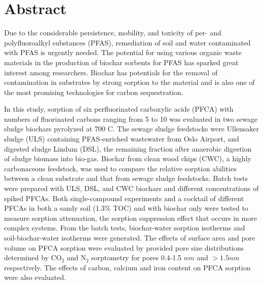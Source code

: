 \newpage
{}
\section*{Abstract}
Due to the considerable persistence, mobility, and toxicity of per- and polyfluoroalkyl substances (PFAS), remediation of soil and water contaminated with PFAS is urgently needed. The potential for using various organic waste materials in the production of biochar sorbents for PFAS has sparked great interest among researchers. Biochar has potentials for the removal of contamination in substrates by strong sorption to the material and is also one of the most promising technologies for carbon sequestration.

In this study, sorption of six perfluorinated carboxylic acids (PFCA) with numbers of fluorinated carbons ranging from 5 to 10 was evaluated in two sewage sludge biochars pyrolyzed at 700 \textdegree C. The sewage sludge feedstocks were Ullensaker sludge (ULS) containing PFAS-enriched wastewater from Oslo Airport, and digested sludge Lindum (DSL), the remaining fraction after anaerobic digestion of sludge biomass into bio-gas. Biochar from clean wood chips (CWC), a highly carbonaceous feedstock, was used to compare the relative sorption abilities between a clean substrate and that from sewage sludge feedstocks. Batch tests were prepared with ULS, DSL, and CWC biochars and different concentrations of spiked PFCAs. Both single-compound experiments and a cocktail of different PFCAs in both a sandy soil (1.3\% TOC) and with biochar only were tested to measure sorption attenuation, the sorption suppression effect that occurs in more complex systems. From the batch tests, biochar-water sorption isotherms and soil-biochar-water isotherms were generated. The effects of surface area and pore volume on PFCA sorption were evaluated by provided pore size distributions determined by $\mathrm{CO_2}$ and $\mathrm{N_2}$ sorptometry for pores 0.4-1.5 $nm$ and $>1.5 nm$ respectively. The effects of carbon, calcium and iron content on PFCA sorption were also evaluated. 

